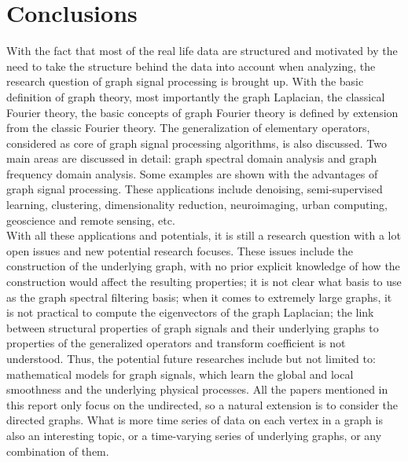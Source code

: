 \documentclass[conference]{IEEEtran}
\begin{document}
\section{Conclusions}  
With the fact that most of the real life data are structured and motivated by the need to take the structure behind the data into account when analyzing, the research question of graph signal processing is brought up. With the basic definition of graph theory, most importantly the graph Laplacian, the classical Fourier theory, the basic concepts of graph Fourier theory is defined by extension from the classic Fourier theory. The generalization of elementary operators, considered as core of graph signal processing algorithms, is also discussed. Two main areas are discussed in detail: graph spectral domain analysis and graph frequency domain analysis. Some examples are shown with the advantages of graph signal processing. These applications include denoising, semi-supervised learning, clustering, dimensionality reduction, neuroimaging, urban computing, geoscience and remote sensing, etc.\\
With all these applications and potentials, it is still a research question with a lot open issues and new potential research focuses. These issues include the construction of the underlying graph, with no prior explicit knowledge of how the construction would affect the resulting properties; it is not clear what basis to use as the graph spectral filtering basis; when it comes to extremely large graphs, it is not practical to compute the eigenvectors of the graph Laplacian; the link between structural properties of graph signals and their underlying graphs to properties of the generalized operators and transform coefficient is not understood. Thus, the potential future researches include but not limited to: mathematical models for graph signals, which learn the global and local smoothness and the underlying physical processes. All the papers mentioned in this report only focus on the undirected, so a natural extension is to consider the directed graphs. What is more time series of data on each vertex in a graph is also an interesting topic, or a time-varying series of underlying graphs, or any combination of them.




\end{document}
